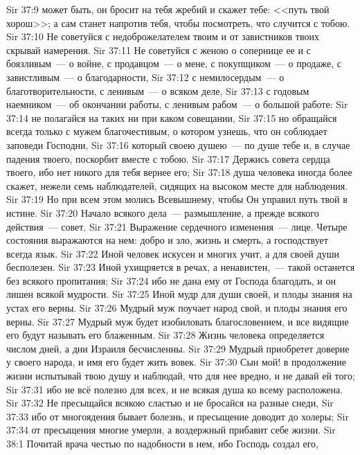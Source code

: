 \vs Sir 37:9 может быть, он бросит на тебя жребий и скажет тебе: <<путь твой хорош>>; а сам станет напротив тебя, чтобы посмотреть, что случится с тобою.
\vs Sir 37:10 Не советуйся с недоброжелателем твоим и от завистников твоих скрывай намерения.
\vs Sir 37:11 Не советуйся с женою о сопернице ее и с боязливым~--- о войне, с продавцом~--- о мене, с покупщиком~--- о продаже, с завистливым~--- о благодарности,
\vs Sir 37:12 с немилосердым~--- о благотворительности, с ленивым~--- о всяком деле,
\vs Sir 37:13 с годовым наемником~--- об окончании работы, с ленивым рабом~--- о большой работе:
\vs Sir 37:14 не полагайся на таких ни при каком совещании,
\vs Sir 37:15 но обращайся всегда только с мужем благочестивым, о котором узнешь, что он соблюдает заповеди Господни,
\vs Sir 37:16 который своею душею~--- по душе тебе и, в случае падения твоего, поскорбит вместе с тобою.
\vs Sir 37:17 Держись совета сердца твоего, ибо нет никого для тебя вернее его;
\vs Sir 37:18 душа человека иногда более скажет, нежели семь наблюдателей, сидящих на высоком месте для наблюдения.
\vs Sir 37:19 Но при всем этом молись Всевышнему, чтобы Он управил путь твой в истине.
\rsbpar\vs Sir 37:20 Начало всякого дела~--- размышление, а прежде всякого действия~--- совет.
\vs Sir 37:21 Выражение сердечного изменения~--- лице. Четыре состояния выражаются на нем: добро и зло, жизнь и смерть, а господствует всегда язык.
\vs Sir 37:22 Иной человек искусен и многих учит, а для своей души бесполезен.
\vs Sir 37:23 Иной ухищряется в речах, а  ненавистен,~--- такой останется без всякого пропитания;
\vs Sir 37:24 ибо не дана ему от Господа благодать, и он лишен всякой мудрости.
\vs Sir 37:25 Иной мудр для души своей, и плоды знания на устах его верны.
\vs Sir 37:26 Мудрый муж поучает народ свой, и плоды знания его верны.
\vs Sir 37:27 Мудрый муж будет изобиловать благословением, и все видящие его будут называть его блаженным.
\vs Sir 37:28 Жизнь человека определяется числом дней, а дни Израиля бесчисленны.
\vs Sir 37:29 Мудрый приобретет доверие у своего народа, и имя его будет жить вовек.
\rsbpar\vs Sir 37:30 Сын мой! в продолжение жизни испытывай твою душу и наблюдай, что для нее вредно, и не давай ей того;
\vs Sir 37:31 ибо не всё полезно для всех, и не всякая душа ко всему расположена.
\vs Sir 37:32 Не пресыщайся всякою сластью и не бросайся на разные снеди,
\vs Sir 37:33 ибо от многоядения бывает болезнь, и пресыщение доводит до холеры;
\vs Sir 37:34 от пресыщения многие умерли, а воздержный прибавит себе жизни.
\vs Sir 38:1 Почитай врача честью по надобности в нем, ибо Господь создал его,
